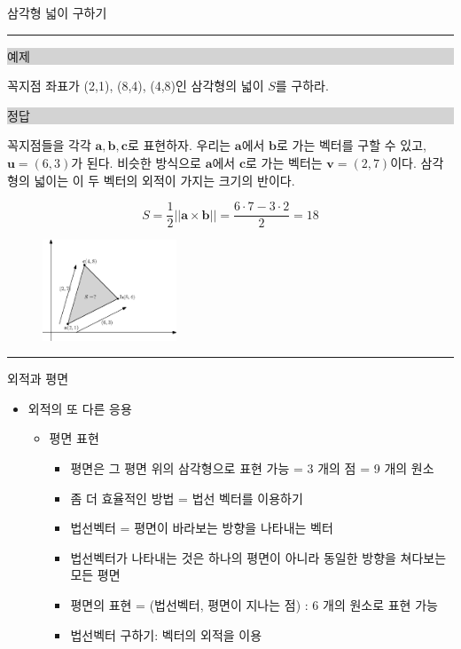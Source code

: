 \begin{frame}{삼각형 넓이 구하기}

\hrule
\noindent \colorbox{lightgray}{\begin{minipage}{6cm}예제\end{minipage}} 

\noindent 꼭지점 좌표가 (2,1), (8,4), (4,8)인 삼각형의 넓이 $S$를 구하라.

\noindent \colorbox{lightgray}{\begin{minipage}{6cm}정답\end{minipage}} 

{\small 꼭지점들을 각각 $\mathbf a, \mathbf b, \mathbf c$로 표현하자.
우리는 $\mathbf a$에서 $\mathbf b$로 가는 벡터를 구할 수 있고, $\mathbf u = (6,3)$가 된다.
비슷한 방식으로 $\mathbf a$에서 $\mathbf c$로 가는 벡터는 $\mathbf v = (2,7)$이다.
삼각형의 넓이는 이 두 벡터의 외적이 가지는 크기의 반이다.}

$$S = \frac{1}{2} ||\mathbf a \times \mathbf b || = \frac{6 \cdot 7 - 3 \cdot 2}{2} = 18$$

\begin{figure}
    \includegraphics[width=4cm]{Math_vector/triangleArea.eps}
\end{figure}

\hrule

\end{frame}

\begin{frame}{외적과 평면}

\begin{itemize}
\item 외적의 또 다른 응용
	\begin{itemize}
	\item 평면 표현
		\begin{itemize}
		\item 평면은 그 평면 위의 삼각형으로 표현 가능 = 3 개의 점 = 9 개의 원소
		\item 좀 더 효율적인 방법 = 법선 벡터를 이용하기
		\item 법선벡터 = 평면이 바라보는 방향을 나타내는 벡터
		\item 법선벡터가 나타내는 것은 하나의 평면이 아니라 동일한 방향을 쳐다보는 모든 평면
		\item 평면의 표현 = (법선벡터, 평면이 지나는 점) : 6 개의 원소로 표현 가능
		\item 법선벡터 구하기: 벡터의 외적을 이용
		\end{itemize}
	\end{itemize}
\end{itemize}

\end{frame}

